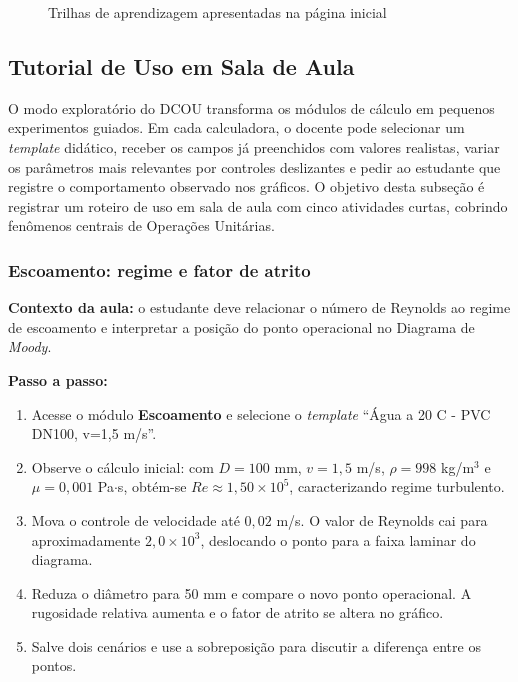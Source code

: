 \begin{figure}[H]
    \centering
    \caption{Trilhas de aprendizagem apresentadas na página inicial}
    \label{fig:trilhas}
\end{figure}

\subsection{Tutorial de Uso em Sala de Aula}

O modo exploratório do DCOU transforma os módulos de cálculo em pequenos experimentos guiados. Em cada calculadora, o docente pode selecionar um \textit{template} didático, receber os campos já preenchidos com valores realistas, variar os parâmetros mais relevantes por controles deslizantes e pedir ao estudante que registre o comportamento observado nos gráficos. O objetivo desta subseção é registrar um roteiro de uso em sala de aula com cinco atividades curtas, cobrindo fenômenos centrais de Operações Unitárias.

\subsubsection{Escoamento: regime e fator de atrito}

\textbf{Contexto da aula:} o estudante deve relacionar o número de Reynolds ao regime de escoamento e interpretar a posição do ponto operacional no Diagrama de \textit{Moody}.

\textbf{Passo a passo:}
\begin{enumerate}
    \item Acesse o módulo \textbf{Escoamento} e selecione o \textit{template} ``Água a 20 C - PVC DN100, v=1,5 m/s''.
    \item Observe o cálculo inicial: com $D = 100$ mm, $v = 1{,}5$ m/s, $\rho = 998$ kg/m$^3$ e $\mu = 0{,}001$ Pa$\cdot$s, obtém-se $Re \approx 1{,}50 \times 10^5$, caracterizando regime turbulento.
    \item Mova o controle de velocidade até $0{,}02$ m/s. O valor de Reynolds cai para aproximadamente $2{,}0 \times 10^3$, deslocando o ponto para a faixa laminar do diagrama.
    \item Reduza o diâmetro para 50 mm e compare o novo ponto operacional. A rugosidade relativa aumenta e o fator de atrito se altera no gráfico.
    \item Salve dois cenários e use a sobreposição para discutir a diferença entre os pontos.
\end{enumerate}

